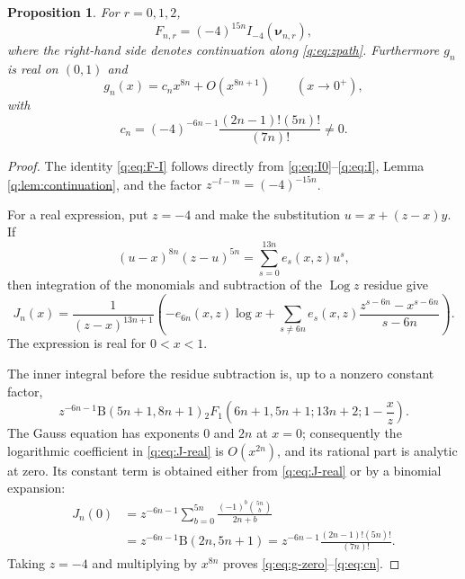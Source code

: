 \documentclass[11pt]{amsart}
\newcommand{\Log}{\operatorname{Log}}
\newcommand{\Bfun}{\mathrm B}
\theoremstyle{plain}
\newtheorem{proposition}[theorem]{Proposition}
\theoremstyle{remark}\newtheorem{remark}[theorem]{Remark}
\numberwithin{equation}{section}
\begin{document}
\begin{proposition}\label{q:prop:F-I}
For $r=0,1,2$,
\begin{equation}\label{q:eq:F-I}
 F_{n,r}=(-4)^{15n}I_{-4}(\boldsymbol\nu_{n,r}),
\end{equation}
where the right-hand side denotes continuation along \eqref{q:eq:zpath}.
Furthermore $g_n$ is real on $(0,1)$ and
\begin{equation}\label{q:eq:g-zero}
 g_n(x)=c_nx^{8n}+O(x^{8n+1})\qquad(x\to0^+),
\end{equation}
with
\begin{equation}\label{q:eq:cn}
 c_n=(-4)^{-6n-1}\frac{(2n-1)!(5n)!}{(7n)!}\ne0.
\end{equation}
\end{proposition}

\begin{proof}
The identity \eqref{q:eq:F-I} follows directly from
\eqref{q:eq:I0}--\eqref{q:eq:I}, Lemma \ref{q:lem:continuation}, and the factor
$z^{-l-m}=(-4)^{-15n}$.

For a real expression, put $z=-4$ and make the substitution
$u=x+(z-x)y$.  If
\[
 (u-x)^{8n}(z-u)^{5n}=\sum_{s=0}^{13n}e_s(x,z)u^s,
\]
then integration of the monomials and subtraction of the $\Log z$ residue
give
\begin{equation}\label{q:eq:J-real}
 J_n(x)=\frac1{(z-x)^{13n+1}}
 \left(
 -e_{6n}(x,z)\log x
 +\sum_{s\ne6n}e_s(x,z)
   \frac{z^{s-6n}-x^{s-6n}}{s-6n}
 \right).
\end{equation}
The expression is real for $0<x<1$.

The inner integral before the residue subtraction is, up to a nonzero
constant factor,
\begin{equation}\label{q:eq:hypergeom-inner}
 z^{-6n-1}\Bfun(5n+1,8n+1)
 {}_2F_1\left(6n+1,5n+1;13n+2;1-\frac{x}{z}\right).
\end{equation}
The Gauss equation has exponents $0$ and $2n$ at $x=0$; consequently the
logarithmic coefficient in \eqref{q:eq:J-real} is $O(x^{2n})$, and its rational
part is analytic at zero.  Its constant term is obtained either from
\eqref{q:eq:J-real} or by a binomial expansion:
\begin{align*}
 J_n(0)
 &=z^{-6n-1}\sum_{b=0}^{5n}
   \frac{(-1)^b\binom{5n}{b}}{2n+b}\\
 &=z^{-6n-1}\Bfun(2n,5n+1)
 =z^{-6n-1}\frac{(2n-1)!(5n)!}{(7n)!}.
\end{align*}
Taking $z=-4$ and multiplying by $x^{8n}$ proves
\eqref{q:eq:g-zero}--\eqref{q:eq:cn}.
\end{proof}
\end{document}
